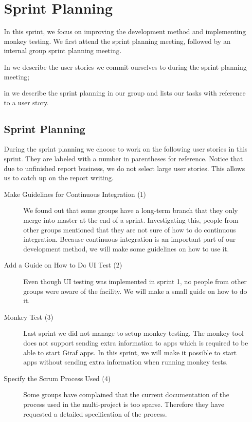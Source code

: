 \chapter{Sprint Planning}\label{chap:s3_sprintplanning}
In this sprint, we focus on improving the development method and implementing monkey testing. We first attend the \bd sprint planning meeting, followed by an internal group sprint planning meeting.

\begin{chapterorganization}
  \item In  we describe the user stories we commit ourselves to during the \bd sprint planning meeting;
  \item in  we describe the sprint planning in our group and lists our tasks with reference to a user story.
\end{chapterorganization}

\section{\bdtitle Sprint Planning}\label{sec:S3_bd}
During the \bd sprint planning we choose to work on the following user stories in this sprint. They are labeled with a number in parentheses for reference. Notice that due to unfinished report business, we do not select large user stories. This allows us to catch up on the report writing.

\begin{description}
  \item[Make Guidelines for Continuous Integration (1)] We found out that some groups have a long-term branch that they only merge into master at the end of a sprint. Investigating this, people from other groups mentioned that they are not sure of how to do continuous integration. Because continuous integration is an important part of our development method, we will make some guidelines on how to use it.
  \item[Add a Guide on How to Do UI Test (2)] Even though UI testing was implemented in sprint 1, no people from other groups were aware of the facility. We will make a small guide on how to do it.
  \item[Monkey Test (3)] Last sprint we did not manage to setup monkey testing. The monkey tool does not support sending extra information to apps which is required to be able to start Giraf apps. In this sprint, we will make it possible to start apps without sending extra information when running monkey tests.
  \item[Specify the Scrum Process Used (4)] Some groups have complained that the current documentation of the process used in the multi-project is too sparse. Therefore they have requested a detailed specification of the process.
\end{description}

